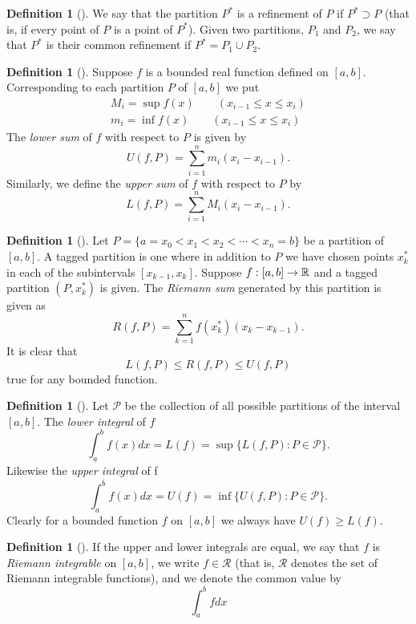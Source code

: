 \documentclass[	DIV=calc,paper=a4,fontsize=11pt]{scrartcl}	 	%
\theoremstyle{definition}
\newtheorem{defn}[thm]{Definition}
\theoremstyle{plain}
\theoremstyle{remark}
\begin{document}
\begin{defn}[\textbf{\color{blue}{Refinement}}]
We say that the partition $P^*$ is a refinement of $P$ if $P^*\supset P$ (that is, if every point of $P$ is a point of $P^*$). Given two partitions, $P_1$ and $P_2$, we say that $P^*$ is their common refinement if $P^* = P_1\cup P_2$.
\end{defn}

\begin{defn}[\textbf{\color{blue}{Upper and Lower sum}}]
Suppose $f$ is a bounded real function defined on $[a, b]$. Corresponding to each partition $P$ of $[a, b]$ we put
\begin{align*}
M_i = \sup f(x)\qquad (x_{i-1}\leq x\leq x_i)\\
m_i = \inf f(x)\qquad (x_{i-1}\leq x\leq x_i)
\end{align*}
The \textit{lower sum} of $f$ with respect to $P$ is given by
$$U(f,P) =\sum_{i=1}^{n}m_i(x_i-x_{i-1}).$$
Similarly, we define the \textit{upper sum} of $f$ with respect to $P$ by
$$L(f,P) =\sum_{i=1}^{n}M_i(x_i-x_{i-1}).$$
\end{defn}
\begin{defn}[\textbf{\color{blue}{Riemann Sum}}]
Let $P = \{a = x_0 < x_1 < x_2 < \cdots < x_n = b\}$ be a partition of $[a, b]$. A tagged partition is one where in addition to $P$ we have chosen points $x^{*}_k$ in each of the subintervals $[x_{k-1}, x_k]$. Suppose $f : [a, b]\to\Bbb R$ and a tagged partition $(P,x^{*}_k)$ is given. The \textit{Riemann sum} generated by this partition is given as
$$
R(f,P) =\sum_{k=1}^{n}f(x^{*}_k)(x_k-x_{k-1}).
$$
It is clear that
$$L(f,P) \leq R(f,P) \leq U(f,P)$$
true for any bounded function.
\end{defn}

\begin{defn}[\textbf{\color{blue}{Upper and Lower Integrals}}]
Let $\mathcal{P}$ be the collection of all possible partitions of the interval $[a, b]$. The \textit{lower integral} of $f$
$$\int_{\underline{a}}^{b}f(x) dx = L(f) = \sup\{L(f,P) : P \in \mathcal{P}\}.$$
Likewise the \textit{upper integral} of f
$$\int_{a}^{\overline{b}}f(x) dx = U(f) = \inf\{U(f,P) : P \in \mathcal{P}\}.$$
Clearly for a bounded function $f$ on $[a, b]$ we always have $U(f) \geq L(f)$.
\end{defn}

\begin{defn}[\textbf{\color{blue}{Riemann Integrable}}]
If the upper and lower integrals are equal, we say that $f$ is \textit{Riemann integrable} on $[a, b]$, we write $f\in\mathcal{R}$ (that is, $\mathcal{R}$ denotes the set of Riemann integrable functions), and we denote the common value by
\[\int_a^b fdx\]
\end{defn}
\end{document}
